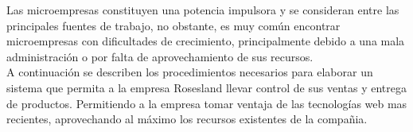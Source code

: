 Las microempresas constituyen una potencia impulsora y se consideran entre las principales fuentes de trabajo, no obstante, es muy común encontrar microempresas con dificultades de crecimiento, principalmente debido a una mala administración o por falta de aprovechamiento de sus recursos. \\[0.8cm]
A continuación se describen los procedimientos necesarios para elaborar un sistema que permita a la empresa Rosesland llevar control de sus ventas y entrega de productos. Permitiendo a la empresa tomar ventaja de las tecnologías web mas recientes, aprovechando al máximo los recursos existentes de la compañia.